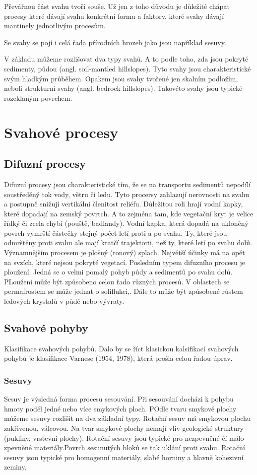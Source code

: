 Převářnou část svahu tvoří souše. Už jen z toho důvodu je důležité chápat procesy které dávají svahu konkrétní formu a faktory, které svahy dávají mantinely jednotlivým procesům. 

Se svahy se pojí i celá řada přírodních hrozeb jako jsou například sesuvy. 

V základu můžeme rozlišovat dva typy svahů.  A to podle toho, zda jsou pokryté sedimenty, půdou (angl. soil-mantled hillslopes). Tyto svahy jsou charakteristické svým hladkým průběhem. Opakem jsou svahy tvořené jen skalním podložím, neboli strukturní svahy (angl. bedrock hillslopes). Takovéto svahy jsou typické rozeklaným povrchem.

\section{Svahové procesy}

\subsection{Difuzní procesy}
Difuzní procesy jsou charakteristické tím, že se na transportu sedimentů nepodílí soustředěný tok vody, větru či ledu. Tyto procersy zahlazují nerovnosti na svahu a postupně snižují vertikální členitost reliéfu. Důležitou roli hrají vodní kapky, které dopadají na zemský povrtch. A to zejména tam, kde vegetační kryt je velice řídký či zcela chybí (pouště, badlandy). Vodní kapka, která dopadá na ukloněný povrch vymrští částečky stejný počet letí proti a po svahu. Ty, které jsou odmrštěny proti svahu ale mají kratčí trajektorii, než ty, které letí po svahu dolů. Významnějším procesem je plošný (ronový) splach. Největší účinky má na opět na svzích, které nejsou pokryté vegetací. Posledním typem difuzního procesu je ploužení. Jedná se o velmi pomalý pohyb půdy a sedimentů po svahu dolů. PLoužení může být způsobeno celou řado různých procesů. V oblastech se permafrostem se může jednat o soliflukci,. Dále to může být způsobené růstem ledových krystalů v půdě nebo vývraty. 


\subsection{Svahové pohyby}
Klasifikace svahových pohybů. Dalo by se říct klasickou kalsifikací svahových pohybů je klasifikace Varnese (1954, 1978), která prošla celou řadou úprav. 

\subsubsection{Sesuvy}
Sesuv je výsledná forma procesu sesouvání. Při sesouvání docházi k pohybu hmoty podél jedné nebo více smykových ploch. POdle tvaru smykové plochy můžeme sesuvy rozlišit na dva základní typy. Rotační sesuv má smykovou plochu zakřivenou, válcovou. Na tvar smykové plochy nemají vliv geologické struktury (pukliny, vrstevní plochy). Rotační sesuvy jsou typické pro nezpevněné čí málo zpevněné materiály.Povrch sesunutých bloků se tak uklání proti svahu. Rotační sesuvy jsou typické pro homogenní materiály, slabé horniny a hlavně kohezivní zeminy. 

